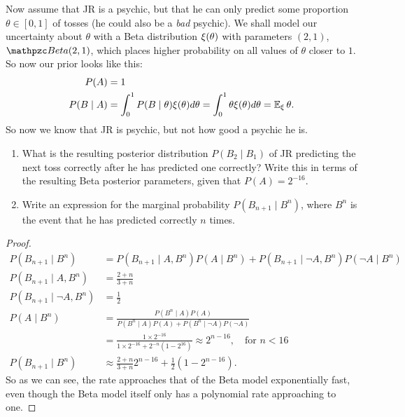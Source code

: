\documentclass[twoside,a4paper]{article}
\begin{document}
\begin{exercise}
  Now assume that JR is a psychic, but that he can only predict some proportion $\theta \in [0,1]$ of tosses (he could also be a \emph{bad} psychic).
We shall model our uncertainty about $\theta$ with a Beta distribution $\xi(\theta)$ with parameters $(2, 1)$, $\Beta(2,1)$, which places higher probability on all values of $\theta$ closer to $1$. So now our prior looks like this:
\begin{align}
  P(A) &= 1\\
  P(B \mid A) &= \int_0^1 P(B \mid \theta) \xi(\theta) d\theta = \int_0^1 \theta \xi(\theta) d\theta = \mathop{\mbox{\ensuremath{\mathbb{E}}}}\nolimits_\xi \theta.\\
\end{align}
So now we know that JR is psychic, but not how good a psychic he is.
\begin{enumerate}
\item What is the resulting posterior distribution $P(B_2 \mid B_1)$ of JR predicting the next toss correctly after he has predicted one correctly? Write this in terms of the resulting Beta posterior parameters, given that $P(A) = 2^{-16}$.
\item Write an expression for the marginal probability $P(B_{n+1} \mid B^n)$, where $B^n$ is the event that he has predicted correctly $n$ times.
\end{enumerate}

\end{exercise}

\begin{proof}
  \begin{align*}
    P(B_{n+1} \mid B^n)
    &=  P(B_{n+1} \mid A, B^n) P(A \mid B^n) + P(B_{n+1} \mid \neg A, B^n) P(\neg A \mid B^n)\\
    P(B_{n+1} \mid A, B^n) &= \frac{2 + n}{3 + n}\\
    P(B_{n+1} \mid \neg A, B^n) &= \frac{1}{2}\\
    P(A \mid B^n)
    &=  \frac{P(B^n \mid A) P(A)}{P(B^n \mid A) P(A) + P(B^n \mid \neg A) P(\neg A)}\\
    &=  \frac{1 \times 2^{-16}}{1 \times 2^{-16} + 2^{-n}(1 - 2^{16})} \approx 2^{n-16}, \quad \textrm{for  $n <16$}\\
    P(B_{n+1} \mid B^n) &\approx \frac{2 + n}{3 + n} 2^{n - 16} + \frac{1}{2} (1 - 2^{n - 16}).
  \end{align*}
  So as we can see, the rate approaches that of the Beta model exponentially fast, even though the Beta model itself only has a polynomial rate approaching to one.
\end{proof}
\end{document}
